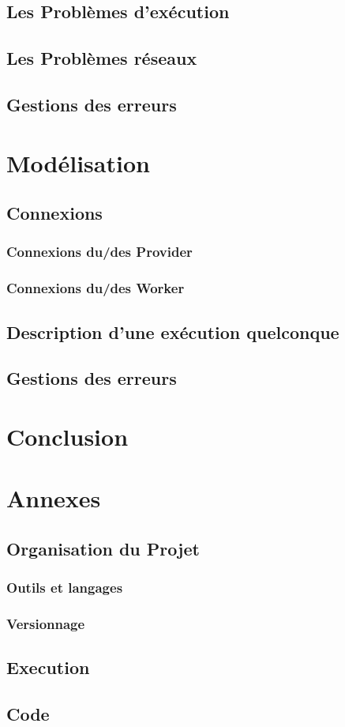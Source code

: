\documentclass[11pt]{report}
\begin{document}
\section{Les Problèmes d’exécution} \newpage
\section{Les Problèmes réseaux}\newpage
\section{Gestions des erreurs}\newpage
\chapter{Modélisation}
\section{Connexions} 
\subsection{Connexions du/des Provider} 
\subsection{Connexions du/des Worker} 
\newpage
\section{Description d'une exécution quelconque} 
\newpage
\section{Gestions des erreurs}
\chapter{Conclusion}
\newpage
\chapter{Annexes}
\section{Organisation du Projet}
\subsection{Outils et langages} 
\subsection{Versionnage} 
\section{Execution}
\newpage
\section{Code}
\newpage
\end{document}
